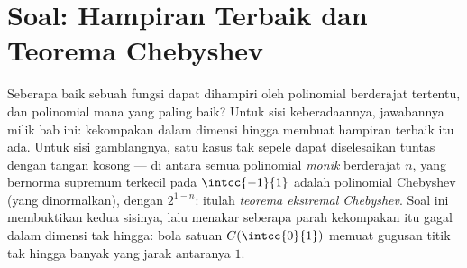 \section{Soal: Hampiran Terbaik dan Teorema Chebyshev}

Seberapa baik sebuah fungsi dapat dihampiri oleh polinomial berderajat
tertentu, dan polinomial mana yang paling baik? Untuk sisi keberadaannya,
jawabannya milik bab ini: kekompakan dalam dimensi
hingga membuat hampiran terbaik itu ada. Untuk sisi gamblangnya,
satu kasus tak sepele dapat diselesaikan tuntas dengan tangan kosong ---
di antara semua polinomial \emph{monik} berderajat $n$, yang bernorma
supremum terkecil pada $\intcc{-1}{1}$ adalah polinomial Chebyshev
(yang dinormalkan), dengan  $2^{1-n}$: itulah \emph{teorema
ekstremal Chebyshev}. Soal ini membuktikan kedua sisinya, lalu menakar
seberapa parah kekompakan itu gagal dalam dimensi tak hingga: bola satuan
$C(\intcc{0}{1})$ memuat gugusan titik tak hingga banyak yang jarak
antaranya $1$.

